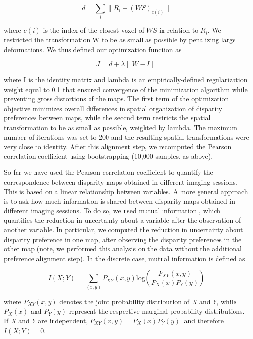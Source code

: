\begin{equation}
d= \sum_{i} \| R_{i}-(WS)_{c(i)}\| 
\end{equation}

where $c(i)$ is the index of the closest voxel of $WS$ in relation to $R_i$. We restricted the transformation W to be as small as possible by penalizing large deformations. We thus defined our optimization function as

\begin{equation}
J=d+\lambda \| W-I \|
\end{equation}

where I is the identity matrix and lambda is an empirically-defined regularization weight equal to 0.1 that ensured convergence of the minimization algorithm while preventing gross distortions of the maps. The first term of the optimization objective minimizes overall differences in spatial organization of disparity preferences between maps, while the second term restricts the spatial transformation to be as small as possible, weighted by lambda. The maximum number of iterations was set to 200 and the resulting spatial transformations were very close to identity. After this alignment step, we recomputed the Pearson correlation coefficient using bootstrapping (10,000 samples, as above). 

So far we have used the Pearson correlation coefficient to quantify the correspondence between disparity maps obtained in different imaging sessions. This is based on a linear relationship between variables. A more general approach is to ask how much information is shared between disparity maps obtained in different imaging sessions. To do so, we used mutual information \cite{Shannon1948}, which quantifies the reduction in uncertainty about a variable after the observation of another variable. In particular, we computed the reduction in uncertainty about disparity preference in one map, after observing the disparity preferences in the other map (note, we performed this analysis on the data without the additional preference alignment step). In the discrete case, mutual information is defined as \cite{shannon1949}

\begin{equation}
I(X;Y)=\sum_{(x,y)}P_{XY} (x,y)  \mathrm{log}⁡\left(\frac{P_{XY}(x,y)}{P_X(x) P_Y(y)}\right)
\end{equation}

where $P_{XY}(x, y)$ denotes the joint probability distribution of $X$ and $Y$, while $P_X(x)$ and $P_Y(y)$ represent the respective marginal probability distributions. If $X$ and $Y$ are independent, $P_{XY}(x, y) = P_X(x) P_Y(y)$, and therefore $I (X; Y) = 0$.

